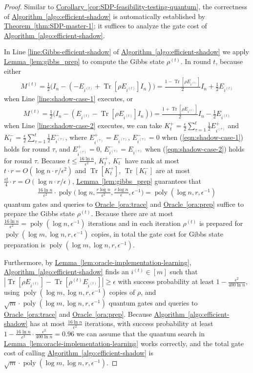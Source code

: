 \documentclass[a4paper,UKenglish,cleveref, autoref]{lipics-v2019}
\theoremstyle{remark}
\numberwithin{equation}{section}
\numberwithin{oracle}{section}
\numberwithin{remark}{section}
\newcommand{\eqn}[1]{(\ref{eqn:#1})}
\newcommand{\ora}[1]{\hyperref[ora:#1]{Oracle~\ref*{ora:#1}}}
\newcommand{\thm}[1]{\hyperref[thm:#1]{Theorem~\ref*{thm:#1}}}
\newcommand{\cor}[1]{\hyperref[cor:#1]{Corollary~\ref*{cor:#1}}}
\newcommand{\lem}[1]{\hyperref[lem:#1]{Lemma~\ref*{lem:#1}}}
\newcommand{\algo}[1]{\hyperref[algo:#1]{Algorithm~\ref*{algo:#1}}}
\newcommand{\range}[1]{[#1]}
\DeclareMathOperator{\poly}{poly}
\DeclareMathOperator{\Tr}{Tr}
\begin{document}
\begin{proof}
Similar to \cor{SDP-feasibility-testing-quantum}, the correctness of \algo{efficient-shadow} is automatically established by \thm{SDP-master-1}; it suffices to analyze the gate cost of \algo{efficient-shadow}.

In Line \ref{line:Gibbs-efficient-shadow} of \algo{efficient-shadow} we apply \lem{gibbs_prep} to compute the Gibbs state $\rho^{(t)}$. In round $t$, because either
\begin{align}\label{eqn:shadow-case-1}
M^{(t)}=\frac{1}{2}\big(I_{n}-(-E_{i^{(t)}}+\Tr[\rho E_{i^{(t)}}]I_{n})\big)=\frac{1-\Tr[\rho E_{i^{(t)}}]}{2}I_{n}+\frac{1}{2}E_{i^{(t)}}
\end{align}
when Line \ref{line:shadow-case-1} executes, or
\begin{align}\label{eqn:shadow-case-2}
M^{(t)}=\frac{1}{2}\big(I_{n}-(E_{i^{(t)}}-\Tr[\rho E_{i^{(t)}}]I_{n})\big)=\frac{1+\Tr[\rho E_{i^{(t)}}]}{2}I_{n}-\frac{1}{2}E_{i^{(t)}}
\end{align}
when Line \ref{line:shadow-case-2} executes, we can take $K_{t}^{+}=\frac{\epsilon}{2}\sum_{\tau=1}^{t}\frac{1}{2}E_{i^{(\tau)}}^{+}$ and $K_{t}^{-}=\frac{\epsilon}{2}\sum_{\tau=1}^{t}\frac{1}{2}E_{i^{(\tau)}}^{-}$, where $E_{i^{(\tau)}}^{+}=E_{i^{(\tau)}}$, $E_{i^{(\tau)}}^{-}=0$ when \eqn{shadow-case-1} holds for round $\tau$, and $E_{i^{(\tau)}}^{+}=0$, $E_{i^{(\tau)}}^{-}=E_{i^{(\tau)}}$ when \eqn{shadow-case-2} holds for round $\tau$. Because $t\leq\frac{16\ln n}{\epsilon^{2}}$, $K_{t}^{+}$, $K_{t}^{-}$ have rank at most $t\cdot r=O(\log n\cdot r/\epsilon^{2})$ and $\Tr[K_{t}^{+}]$, $\Tr[K_{t}^{-}]$ are at most $\frac{\epsilon t}{4}\cdot r=O(\log n\cdot r/\epsilon)$, \lem{gibbs_prep} guarantees that
\begin{align}
\frac{16\ln n}{\epsilon^{2}}\cdot\poly\Big(\log n,\frac{r\log n}{\epsilon^{2}},\frac{r\log n}{\epsilon},\epsilon^{-1}\Big)=\poly(\log n,r,\epsilon^{-1})
\end{align}
quantum gates and queries to \ora{trace} and \ora{prep} suffice to prepare the Gibbs state $\rho^{(t)}$. Because there are at most $\frac{16\ln n}{\epsilon^{2}}=\poly(\log n,\epsilon^{-1})$ iterations and in each iteration $\rho^{(t)}$ is prepared for $\poly(\log m,\log n,r,\epsilon^{-1})$ copies, in total the gate cost for Gibbs state preparation is $\poly(\log m,\log n,r,\epsilon^{-1})$.

Furthermore, by \lem{oracle-implementation-learning}, \algo{efficient-shadow} finds an $i^{(t)}\in\range{m}$ such that $|\Tr[\rho E_{i^{(t)}}]-\Tr[\rho^{(t)} E_{i^{(t)}}]|\geq\epsilon$ with success probability at least $1-\frac{\epsilon^{2}}{400\ln n}$, using $\poly(\log m,\log n,r,\epsilon^{-1})$ copies of $\rho$, and $\sqrt{m}\cdot\poly(\log m,\log n,r,\epsilon^{-1})$ quantum gates and queries to \ora{trace} and \ora{prep}. Because \algo{efficient-shadow} has at most $\frac{16\ln n}{\epsilon^{2}}$ iterations, with success probability at least $1-\frac{16\ln n}{\epsilon^{2}}\cdot\frac{\epsilon^{2}}{400\ln n}=0.96$ we can assume that the quantum search in \lem{oracle-implementation-learning} works correctly, and the total gate cost of calling \algo{efficient-shadow} is $\sqrt{m}\cdot\poly(\log m,\log n,r,\epsilon^{-1})$.


\end{proof}
\end{document}
